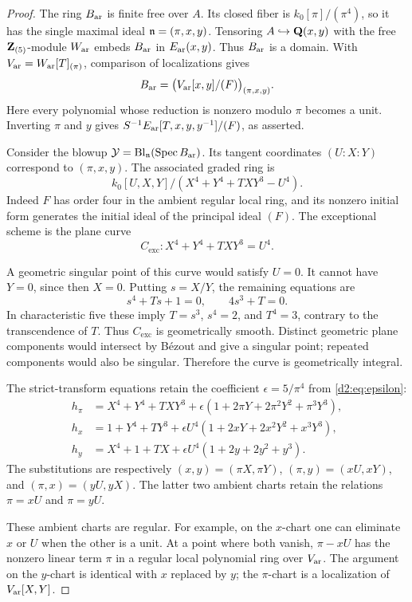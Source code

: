 \begin{proof}
The ring \(B_{\mathrm{ar}}\) is finite free over \(A\).
Its closed fiber is \(k_0[\pi]/(\pi^4)\), so it has the single maximal
ideal \(\mathfrak n=(\pi,x,y)\).
Tensoring \(A\hookrightarrow\mathbf{Q}(x,y)\) with the free
\(\mathbf{Z} _{(5)}\)-module \(W_{\mathrm{ar}}\) embeds \(B_{\mathrm{ar}}\) in
\(E_{\mathrm{ar}}(x,y)\). Thus \(B_{\mathrm{ar}}\) is a domain.
With \(V_{\mathrm{ar}}=W_{\mathrm{ar}}[T]_{(\pi)}\), comparison of localizations gives
\[
 B_{\mathrm{ar}}=
 \bigl(V_{\mathrm{ar}}[x,y]/(F)\bigr)_{(\pi,x,y)}.
\]
Here every polynomial whose reduction is nonzero modulo \(\pi\)
becomes a unit. Inverting \(\pi\) and \(y\) gives
\(S^{-1}E_{\mathrm{ar}}[T,x,y,y^{-1}]/(F)\), as asserted.

Consider the blowup
\(\mathcal Y=\operatorname{Bl}_{\mathfrak n}(\operatorname{Spec} B_{\mathrm{ar}})\).
Its tangent coordinates \((U:X:Y)\) correspond to \((\pi,x,y)\).
The associated graded ring is
\[
 k_0[U,X,Y]/(X^4+Y^4+TXY^3-U^4).
\]
Indeed \(F\) has order four in the ambient regular local ring, and its
nonzero initial form generates the initial ideal of the principal
ideal \((F)\). The exceptional scheme is the plane curve
\[
 C_{\mathrm{exc}}\colon X^4+Y^4+TXY^3=U^4.
\]

A geometric singular point of this curve would satisfy \(U=0\).
It cannot have \(Y=0\), since then \(X=0\).
Putting \(s=X/Y\), the remaining equations are
\[
 s^4+Ts+1=0,\qquad 4s^3+T=0.
\]
In characteristic five these imply \(T=s^3\), \(s^4=2\), and
\(T^4=3\), contrary to the transcendence of \(T\).
Thus \(C_{\mathrm{exc}}\) is geometrically smooth.
Distinct geometric plane components would intersect by B\'ezout and
give a singular point; repeated components would also be singular.
Therefore the curve is geometrically integral.

The strict-transform equations retain the coefficient
\(\epsilon=5/\pi^4\) from \eqref{d2:eq:epsilon}:
\begin{align*}
 h_\pi&=X^4+Y^4+TXY^3+
       \epsilon(1+2\pi Y+2\pi^2Y^2+\pi^3Y^3),\\
 h_x&=1+Y^4+TY^3+
       \epsilon U^4(1+2xY+2x^2Y^2+x^3Y^3),\\
 h_y&=X^4+1+TX+
       \epsilon U^4(1+2y+2y^2+y^3).
\end{align*}
The substitutions are respectively
\((x,y)=(\pi X,\pi Y)\),
\((\pi,y)=(xU,xY)\), and
\((\pi,x)=(yU,yX)\).
The latter two ambient charts retain the relations
\(\pi=xU\) and \(\pi=yU\).

These ambient charts are regular.
For example, on the \(x\)-chart one can eliminate \(x\) or \(U\) when
the other is a unit. At a point where both vanish,
\(\pi-xU\) has the nonzero linear term \(\pi\) in a regular local
polynomial ring over \(V_{\mathrm{ar}}\).
The argument on the \(y\)-chart is identical with \(x\) replaced by
\(y\); the \(\pi\)-chart is a localization of \(V_{\mathrm{ar}}[X,Y]\).


\end{proof}
